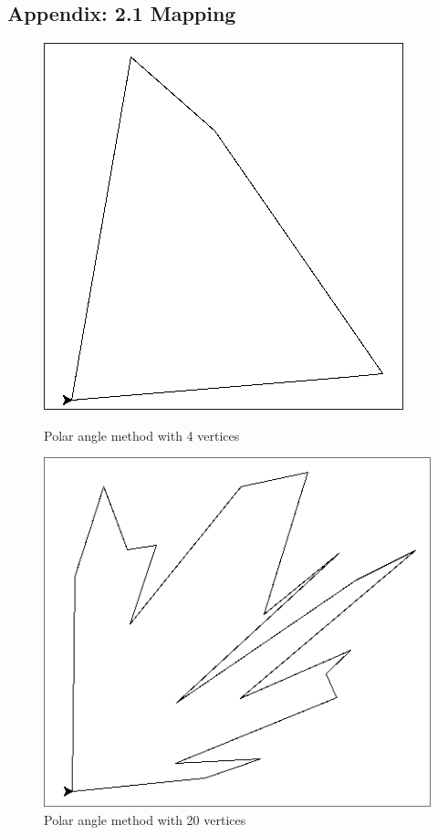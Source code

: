 \documentclass[progress]{cmpreport}
\begin{document}
\newpage
\begin{appendix}
	\section{Appendix: 2.1 Mapping}

	\label{Mapping}
	\begin{figure}[H]
		\centering
		\begin{minipage}[b]{0.45\textwidth}
			\centering
			\includegraphics[width=\textwidth]{images/FirstMappingSmall.jpg}
			\caption{Polar angle method with 4 vertices}
		\end{minipage}
		\hfill
		\begin{minipage}[b]{0.45\textwidth}
			\centering
			\includegraphics[width=\textwidth]{images/FirstMappingLarge.jpg}
			\caption{Polar angle method with 20 vertices}
		\end{minipage}
		\vspace{1em}


\end{figure}
\end{appendix}
\end{document}
